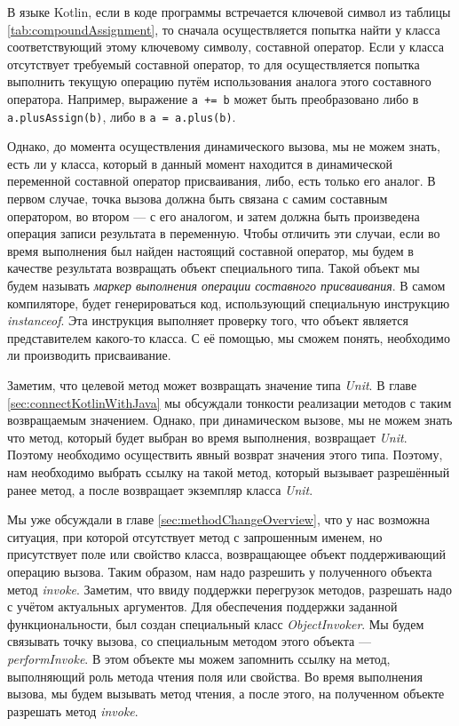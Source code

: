 
В языке Kotlin, если в коде программы встречается ключевой символ из таблицы \ref{tab:compoundAssignment}, то сначала осуществляется попытка найти у класса соответствующий этому ключевому символу, составной оператор. Если у класса отсутствует требуемый составной оператор, то для осуществляется попытка выполнить текущую операцию путём использования аналога этого составного оператора. Например, выражение \texttt{a += b} может быть преобразовано либо в \texttt{a.plusAssign(b)}, либо в \texttt{a = a.plus(b)}. 

Однако, до момента осуществления динамического вызова, мы не можем знать, есть ли у класса, который в данный момент находится в динамической переменной составной оператор присваивания, либо, есть только его аналог. В первом случае, точка вызова должна быть связана с самим составным оператором, во втором --- с его аналогом, и затем должна быть произведена операция записи результата в переменную. Чтобы отличить эти случаи, если во время выполнения был найден настоящий составной оператор, мы будем в качестве результата возвращать объект специального типа. Такой объект мы будем называть \textit{маркер выполнения операции составного присваивания}. 
В самом компиляторе, будет генерироваться код, использующий специальную инструкцию \textit{instanceof}. Эта инструкция выполняет проверку того, что объект является представителем какого-то класса. С её помощью, мы сможем понять, необходимо ли производить присваивание.


Заметим, что целевой метод может возвращать значение типа \textit{Unit}. В главе \ref{sec:connectKotlinWithJava} мы обсуждали тонкости реализации методов с таким возвращаемым значением. Однако, при динамическом вызове, мы не можем знать что метод, который будет выбран во время выполнения, возвращает \textit{Unit}. Поэтому необходимо осуществить явный возврат значения этого типа. Поэтому, нам необходимо выбрать ссылку на такой метод, который вызывает разрешённый ранее метод, а после возвращает экземпляр класса \textit{Unit}.

Мы уже обсуждали в главе \ref{sec:methodChangeOverview}, что у нас возможна ситуация, при которой отсутствует метод с запрошенным именем, но присутствует поле или свойство класса, возвращающее объект поддерживающий операцию вызова.
Таким образом, нам надо разрешить у полученного объекта метод \textit{invoke}. Заметим, что ввиду поддержки перегрузок методов, разрешать надо с учётом актуальных аргументов. Для обеспечения поддержки заданной функциональности, был создан специальный класс \textit{ObjectInvoker}. Мы будем связывать точку вызова, со специальным методом этого объекта --- \textit{performInvoke}. В этом объекте мы можем запомнить ссылку на метод, выполняющий роль метода чтения поля или свойства. Во время выполнения вызова, мы будем вызывать метод чтения, а после этого, на полученном объекте разрешать метод \textit{invoke}.


